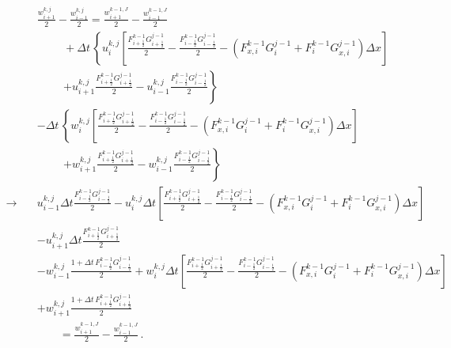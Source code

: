 \documentclass[11pt,a4paper]{article}
\begin{document}
\begin{align*}
    &
    \frac{w^{k,j}_{i+1}}{2} - \frac{w^{k,j}_{i-1}}{2}
    = 
    \frac{w^{k-1,J}_{i+1}}{2} - \frac{w^{k-1,J}_{i-1}}{2}
    \\
    &
    \hspace{1cm}
    + \Delta t \,
    \left\{
    u^{k,j}_i 
    \left[ 
        \frac{F^{k-1}_{i+\frac{1}{2}} G^{j-1}_{i+\frac{1}{2}}}{2} 
        - \frac{F^{k-1}_{i-\frac{1}{2}} G^{j-1}_{i-\frac{1}{2}}}{2}
        - \left(F^{k-1}_{x,i} G^{j-1}_i + F^{k-1}_i G^{j-1}_{x,i}\right)\Delta x
    \right]
    \right.
    \\
    &\hspace{1cm}
    \left.
        + u^{k,j}_{i+1} \frac{F^{k-1}_{i+\frac{1}{2}} G^{j-1}_{i+\frac{1}{2}}}{2}
        - u^{k,j}_{i-1} \frac{F^{k-1}_{i-\frac{1}{2}} G^{j-1}_{i-\frac{1}{2}}}{2}
    \right\}
    \\
    &
    - \Delta t \,
    \left\{
    w^{k,j}_i 
    \left[ 
        \frac{F^{k-1}_{i+\frac{1}{2}} G^{j-1}_{i+\frac{1}{2}}}{2} 
        - \frac{F^{k-1}_{i-\frac{1}{2}} G^{j-1}_{i-\frac{1}{2}}}{2}
        - \left(F^{k-1}_{x,i} G^{j-1}_i + F^{k-1}_i G^{j-1}_{x,i}\right)\Delta x
    \right]
    \right.
    \\
    &\hspace{1cm}
    \left.
        + w^{k,j}_{i+1} \frac{F^{k-1}_{i+\frac{1}{2}} G^{j-1}_{i+\frac{1}{2}}}{2}
        - w^{k,j}_{i-1} \frac{F^{k-1}_{i-\frac{1}{2}} G^{j-1}_{i-\frac{1}{2}}}{2}
    \right\}
    \\
    \rightarrow \quad
    &
    u^{k,j}_{i-1} \Delta t \frac{F^{k-1}_{i-\frac{1}{2}} G^{j-1}_{i-\frac{1}{2}}}{2}
    - u^{k,j}_{i} \Delta t 
    \left[ 
        \frac{F^{k-1}_{i+\frac{1}{2}} G^{j-1}_{i+\frac{1}{2}}}{2} 
        - \frac{F^{k-1}_{i-\frac{1}{2}} G^{j-1}_{i-\frac{1}{2}}}{2}
        - \left(F^{k-1}_{x,i} G^{j-1}_i + F^{k-1}_i G^{j-1}_{x,i}\right)\Delta x
    \right]
    \\
    &
    - u^{k,j}_{i+1} \Delta t \frac{F^{k-1}_{i+\frac{1}{2}} G^{j-1}_{i+\frac{1}{2}}}{2}
    \\
    & 
    - w^{k,j}_{i-1}  \frac{1 + \Delta t \, F^{k-1}_{i-\frac{1}{2}} G^{j-1}_{i-\frac{1}{2}}}{2}
    + w^{k,j}_{i} \Delta t 
    \left[ 
        \frac{F^{k-1}_{i+\frac{1}{2}} G^{j-1}_{i+\frac{1}{2}}}{2} 
        - \frac{F^{k-1}_{i-\frac{1}{2}} G^{j-1}_{i-\frac{1}{2}}}{2}
        - \left(F^{k-1}_{x,i} G^{j-1}_i + F^{k-1}_i G^{j-1}_{x,i}\right)\Delta x
    \right]
    \\
    &
    + w^{k,j}_{i+1} \frac{1 + \Delta t  \, F^{k-1}_{i+\frac{1}{2}} G^{j-1}_{i+\frac{1}{2}}}{2}
    \\
    & \qquad 
    = \frac{w^{k-1,J}_{i+1}}{2} - \frac{w^{k-1,J}_{i-1}}{2}
    \,.
\end{align*}
\end{document}
